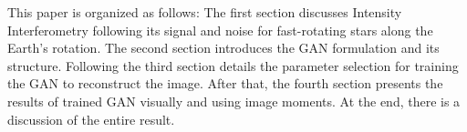 This paper is organized as follows: The first section discusses Intensity Interferometry following its signal and noise for fast-rotating stars along the Earth's rotation. The second section introduces the GAN formulation and its structure. Following the third section details the parameter selection for training the GAN to reconstruct the image. After that, the fourth section presents the results of trained GAN visually and using image moments. At the end, there is a discussion of the entire result.